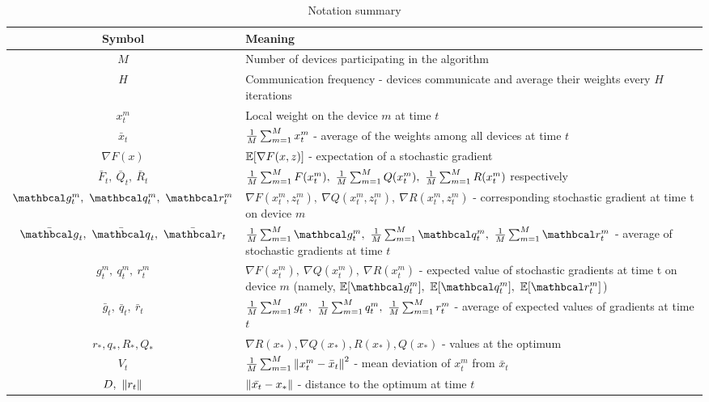 \renewcommand{\arraystretch}{2.5} %
\begin{table}[htbp]
\centering
\begin{tabular}{|c|p{12cm}|}
\hline
\textbf{Symbol} & \textbf{Meaning} \\
\hline

$M$ & Number of devices participating in the algorithm \\

$H$ & Communication frequency - devices communicate and average their weights every $H$ iterations \\

\( x^m_t \) & Local weight on the device $m$ at time $t$ \\

\(\bar{x}_t\) & \( \fsumm{m=1}{M} x^m_t \) - average of the weights among all devices at time $t$ \\



\( \nabla F(x) \) & \( \E[\nabla F(x, z)] \) - expectation of a stochastic gradient \\

\( \bar{F}_t, \ \bar{Q}_t, \ \bar{R}_t \) & \( \fsumm{m=1}{M} F(x^m_t),\ \fsumm{m=1}{M} Q(x^m_t),\ \fsumm{m=1}{M} R(x^m_t) \) respectively \\


\( \mc{g}^m_t, \ \mc{q}^m_t, \ \mc{r}^m_t \) & \( \nabla F(x^m_t, z^m_t),\ \nabla Q(x^m_t, z^m_t),\ \nabla R(x^m_t, z^m_t) \) - corresponding stochastic gradient at time t on device $m$ \\

\( \bar{\mc{g}}_t, \ \bar{\mc{q}}_t, \ \bar{\mc{r}}_t \) & \( \fsumm{m=1}{M} \mc{g}^m_t,\ \fsumm{m=1}{M} \mc{q}^m_t,\ \fsumm{m=1}{M} \mc{r}^m_t \) - average of stochastic gradients at time $t$ \\

\( g^m_t, \ q^m_t, \ r^m_t \) & \( \nabla F(x^m_t),\ \nabla Q(x^m_t),\ \nabla R(x^m_t) \) - expected value of stochastic gradients at time t on device $m$ (namely, 
\( \E[\mc{g}^m_t], \ \E[\mc{q}^m_t], \ \E[\mc{r}^m_t] \)) \\

\( \bar{{g}}_t, \ \bar{{q}}_t, \ \bar{{r}}_t \) & \( \fsumm{m=1}{M} {g}^m_t,\ \fsumm{m=1}{M} {q}^m_t,\ \fsumm{m=1}{M} {r}^m_t \) - average of expected values of gradients at time $t$ \\

\( r_*, q_*, R_*, Q_* \) & \( \nabla R(x_*), \nabla Q(x_*), R(x_*), Q(x_*) \) - values at the optimum \\


\( V_t \) & \( \fsumm{m=1}{M} \norm{x^m_t-\bar{x}_t}^2 \) - mean deviation of $x^m_t$ from $\bar{x}_t$\\

\( D,\ \norm{r_t} \) & \( \norm{\bar{x_t} - x_*} \) - distance to the optimum at time $t$ \\

\hline
\end{tabular}
\caption{Notation summary}
\label{tab:notation}
\end{table}